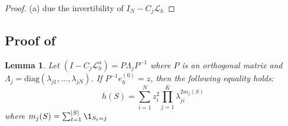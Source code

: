 \documentclass{article} %
\newtheorem{lemma}[theorem]{Lemma}
\begin{document}
\begin{proof}

(a) due the invertibility of $I_N - C_j\mathcal{L}_h$

\end{proof}

\subsection{Proof of } \label{sec:proofsimultaneousallocation}

\begin{lemma} \label{th:simultaneousallocation}
     Let $\left(I - C_j \mathcal{L}_{h}^a\right) = P\Lambda_jP^{-1}$ where $P$ is an orthogonal matrix and $\Lambda_j = \mathrm{diag}(\lambda_{j1}, \dots, \lambda_{jN})$. If $P^{-1}e^{(0)}_h = z$, then the following equality holds:
     \begin{equation} \label{eq:simultaneous}
          h(S) = \sum_{i = 1}^N z_i^2 \prod_{j = 1}^K \lambda_{ji}^{2m_j(S)}
     \end{equation}
     where $m_j(S) = \sum_{t= 1}^{|S|}\1_{S_t = j}$
\end{lemma}
\end{document}
